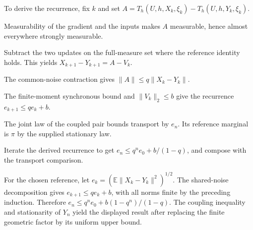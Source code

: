 \documentclass[11pt,a4paper]{article}
\begin{document}
To derive the recurrence, fix \(k\) and set \(A=T_h(U,h,X_k,\xi_k)-T_h(U,h,Y_k,\xi_k)\).



Measurability of the gradient and the inputs makes \(A\) measurable, hence almost everywhere strongly measurable.



Subtract the two updates on the full-measure set where the reference identity holds. This yields \(X_{k+1}-Y_{k+1}=A-V_k\).



The common-noise contraction gives \(\|A\|\le q\|X_k-Y_k\|\).



The finite-moment synchronous bound and \(\|V_k\|_2\le b\) give the recurrence \(e_{k+1}\le qe_k+b\).



The joint law of the coupled pair bounds transport by \(e_n\). Its reference marginal is \(\pi\) by the supplied stationary law.



Iterate the derived recurrence to get \(e_n\le q^ne_0+b/(1-q)\), and compose with the transport comparison.



For the chosen reference, let \(e_k=(\mathbb E\|X_k-Y_k\|^2)^{1/2}\). The shared-noise decomposition gives \(e_{k+1}\le qe_k+b\), with all norms finite by the preceding induction. Therefore \(e_n\le q^ne_0+b(1-q^n)/(1-q)\). The coupling inequality and stationarity of \(Y_n\) yield the displayed result after replacing the finite geometric factor by its uniform upper bound.
\end{document}
